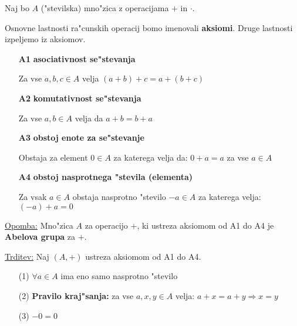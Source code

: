 Naj bo \(A\) ("stevilska) mno"zica z operacijama \(+\) in \(\cdot\).

Osnovne lastnosti ra"cunskih operacij bomo imenovali \textbf{aksiomi}. Druge lastnosti izpeljemo iz aksiomov.
\begin{itemize}
	\item[\textbf{A1}] \textbf{asociativnost se"stevanja}

	Za vse \(a, b, c \in A\) velja \((a + b) + c = a + (b + c)\)
	\item[\textbf{A2}] \textbf{komutativnost se"stevanja}
	
	Za vse \(a, b \in A\) velja da \(a + b = b + a\)
	
	\item[\textbf{A3}] \textbf{obstoj enote za se"stevanje}
	
	Obstaja za element \(0 \in A\) za katerega velja da: \(0 + a = a\) za vse \(a \in A\)
	
	\item[\textbf{A4}] \textbf{obstoj nasprotnega "stevila (elementa)}
	
	Za vsak \(a \in A\) obstaja nasprotno "stevilo \(-a \in A\) za katerega velja: \((-a) + a = 0\)
\end{itemize}

\underline{Opomba:} Mno"zica \(A\) za operacijo \(+\), ki ustreza aksiomom od A1 do A4 je \textbf{Abelova grupa} za \(+\).

\underline{Trditev:} Naj \((A, +)\) ustreza aksiomom od A1 do A4.
\begin{itemize}
	\item[(1)] \(\forall a \in A \) ima eno samo nasprotno "stevilo
	\item[(2)] \textbf{Pravilo kraj"sanja:} za vse \(a, x, y \in A\) velja: \(a + x = a + y \Rightarrow x = y\)
	\item[(3)] \(-0 = 0\)
\end{itemize}

